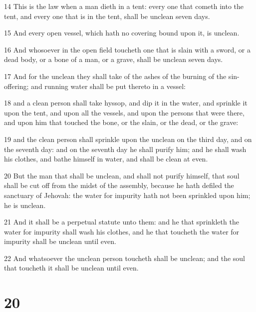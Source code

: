 \par 14 This is the law when a man dieth in a tent: every one that cometh into the tent, and every one that is in the tent, shall be unclean seven days.
\par 15 And every open vessel, which hath no covering bound upon it, is unclean.
\par 16 And whosoever in the open field toucheth one that is slain with a sword, or a dead body, or a bone of a man, or a grave, shall be unclean seven days.
\par 17 And for the unclean they shall take of the ashes of the burning of the sin-offering; and running water shall be put thereto in a vessel:
\par 18 and a clean person shall take hyssop, and dip it in the water, and sprinkle it upon the tent, and upon all the vessels, and upon the persons that were there, and upon him that touched the bone, or the slain, or the dead, or the grave:
\par 19 and the clean person shall sprinkle upon the unclean on the third day, and on the seventh day: and on the seventh day he shall purify him; and he shall wash his clothes, and bathe himself in water, and shall be clean at even.
\par 20 But the man that shall be unclean, and shall not purify himself, that soul shall be cut off from the midst of the assembly, because he hath defiled the sanctuary of Jehovah: the water for impurity hath not been sprinkled upon him; he is unclean.
\par 21 And it shall be a perpetual statute unto them: and he that sprinkleth the water for impurity shall wash his clothes, and he that toucheth the water for impurity shall be unclean until even.
\par 22 And whatsoever the unclean person toucheth shall be unclean; and the soul that toucheth it shall be unclean until even.

\chapter{20}

